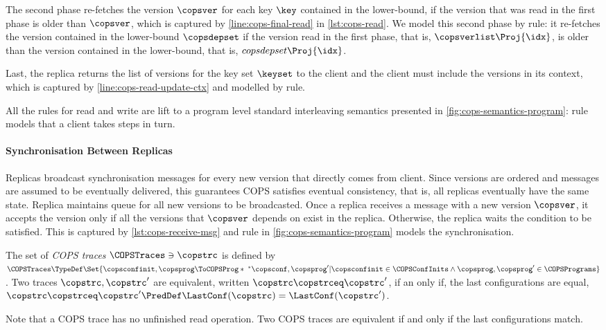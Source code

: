The second phase re-fetches the version \( \copsver \) for each key \( \key \) 
contained in the lower-bound, if the version that was read in the first phase is older than \( \copsver \),
which is captured by \cref{line:cops-final-read} in \cref{lst:cops-read}.
We model this second phase by \rCOPSRefetch rule:
it re-fetches the version contained in the lower-bound \( \copsdepset \)
if the version read in the first phase, that is, \( \copsverlist\Proj{\idx} \),
is older than the version contained in the lower-bound, that is, \( copsdepset\Proj{\idx} \).

Last, the replica returns the list of versions for the key set \( \keyset \)
to the client and the client must include the versions in its context, 
which is captured by \cref{line:cops-read-update-ctx}
and modelled by \rCOPSFinishRead rule.

All the rules for read and write are lift to a program level 
standard interleaving semantics presented in \cref{fig:cops-semantics-program}:
\rCOPSClient rule models that a client takes steps in turn.



\paragraph{Synchronisation Between Replicas}
Replicas broadcast synchronisation messages for every new version that directly comes from client.
Since versions are ordered and messages are assumed to be eventually delivered,
this guarantees COPS satisfies eventual consistency, that is,
all replicas eventually have the same state.
Replica maintains queue for all new versions to be broadcasted.
Once a replica receives a message with a new version \( \copsver \),
it accepts the version only if all the versions that \(\copsver \) depends on exist in the replica.
Otherwise, the replica waits the condition to be satisfied.
This is captured by \cref{lst:cops-receive-msg}
and \rCOPSSync rule in \cref{fig:cops-semantics-program} models the synchronisation.

\begin{definition}
The set of \emph{COPS traces} \( \COPSTraces \ni \copstrc \) is defined by 
\( \COPSTraces \TypeDef \Set{\copsconfinit,\copsprog \ToCOPSProg*{\;}^* \copsconf,\copsprog' | 
        \copsconfinit \in \COPSConfInits \land \copsprog, \copsprog' \in \COPSPrograms } \).
Two traces \( \copstrc, \copstrc' \) are equivalent, written \( \copstrc \copstrceq \copstrc' \),
if an only if, the last configurations are equal,
\( \copstrc \copstrceq \copstrc' \PredDef \LastConf(\copstrc) = \LastConf(\copstrc') \).
\end{definition}

Note that a COPS trace has no unfinished read operation.
Two COPS traces are equivalent if and only if the last configurations match.

